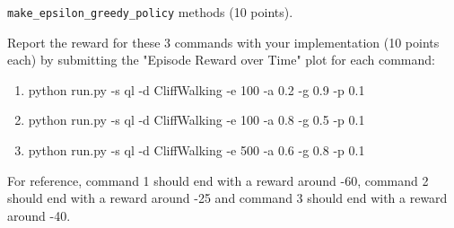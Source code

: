 \documentclass[a4paper]{article}
\theoremstyle{definition}
\begin{document}
\verb|make_epsilon_greedy_policy| methods (10 points). 

Report the reward for these 3 commands with your implementation (10 points each) by submitting the "Episode Reward over Time" plot for each command:

\begin{enumerate}
    \item  python run.py -s ql -d CliffWalking -e 100 -a 0.2 -g 0.9 -p 0.1 
    \item  python run.py -s ql -d CliffWalking -e 100 -a 0.8 -g 0.5 -p 0.1 
    \item  python run.py -s ql -d CliffWalking -e 500 -a 0.6 -g 0.8 -p 0.1
\end{enumerate}

For reference, command 1 should end with a reward around -60, command 2 should end with a reward around -25 and command 3 should end with a reward around -40.
\end{document}
